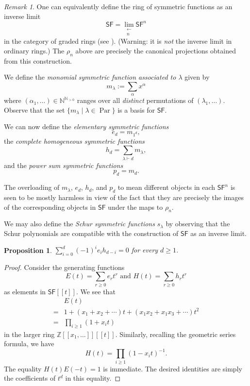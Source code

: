 \documentclass[12pt]{article}
\theoremstyle{plain}
\newtheorem{proposition}[theorem]{Proposition}
\theoremstyle{definition}
\theoremstyle{remark}
\newtheorem{remark}[theorem]{Remark}
\numberwithin{equation}{section}
\begin{document}
\begin{remark}
One can equivalently define the ring of symmetric functions as an inverse
limit
\[
\mathsf{SF} = \lim_{\substack{\longleftarrow\\n}} \mathsf{SF}^n
\]
in the category of graded rings (see \cite{Macdonald}).
(Warning: it is \emph{not} the inverse limit in ordinary rings.)
The $\rho_n$ above are precisely the canonical projections obtained from
this construction.
\end{remark}

We define the \emph{monomial symmetric function associated to $\lambda$}
given by
\[
m_\lambda := \sum_{\alpha} x^\alpha
\]
where $(\alpha_1,\ldots) \in \mathbb{N}^{\mathbb{N}_{>0}}$ ranges over all
\emph{distinct} permutations of $(\lambda_1,\ldots)$.
Observe that the set $\{ m_\lambda \mid \lambda \in
\operatorname{Par}\}$ is a basis for $\mathsf{SF}$.

We can now define the \emph{elementary symmetric functions}
\[
e_d = m_{1^d},
\]
the \emph{complete homogeneous symmetric functions}
\[
h_d = \sum_{\lambda \vdash d} m_\lambda ,
\]
and the \emph{power sum symmetric functions}
\[
p_d = m_{d}.
\]

The overloading of $m_\lambda$, $e_d$, $h_d$, and $p_d$ to mean
different objects in each $\mathsf{SF}^n$ is seen to be mostly harmless
in view of the fact that they are precisely the images of the
corresponding objects in $\mathsf{SF}$ under the maps to $\rho_n$.

We may also define the \emph{Schur symmetric functions}
$s_\lambda$ by observing that the Schur polynomials are compatible
with the construction of $\mathsf{SF}$ as an inverse limit.

\begin{proposition}
$\displaystyle\sum_{i=0}^d (-1)^i e_i h_{d-i}=0$ for every $d \ge 1$.
\end{proposition}

\begin{proof}
Consider the generating functions
\[ E(t) = \sum_{r \ge 0} e_r t^r
\textrm{ and }
H(t) = \sum_{r \ge 0} h_r t^r \]
as elements in $\mathsf{SF}[[t]]$.
We see that
\begin{align*}
& E(t)\\
 =& 1 + (x_1+x_2+\cdots)t
+ (x_1x_2+x_1x_3+\cdots)t^2 \\
=&\prod_{i \ge 1} (1+x_i t)
\end{align*}
in the larger ring $\mathbb{Z}[[x_1,\ldots]][[t]]$.
Similarly, recalling the geometric series formula, we have
\[
H(t) = \prod_{i \ge 1} (1-x_i t)^{-1} .
\]
The equality $H(t)E(-t)=1$ is immediate.
The desired identities are simply the coefficients of $t^d$
in this equality.
\end{proof}
\end{document}
